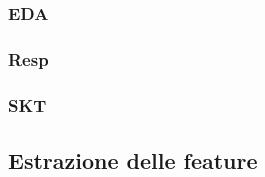 \subsubsection{EDA}

\subsubsection{Resp}

\subsubsection{SKT}





\subsection{Estrazione delle feature}